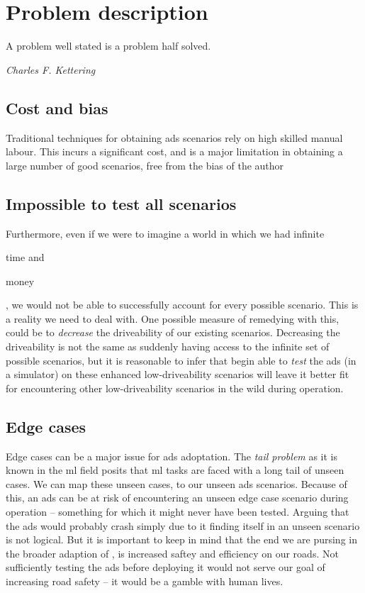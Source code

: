 \chapter{Problem description}\label{sec:problemDescription}

\epigraph{A problem well stated is a problem half solved.}{\textit{Charles F. Kettering}}

\section{Cost and bias}

Traditional techniques for obtaining \acrshort{ads} scenarios rely on high skilled manual labour.
This incurs a significant cost, and is a major limitation in obtaining a large number of good
scenarios, free from the bias of the author


\section{Impossible to test all scenarios}
Furthermore, even if we were to imagine a world in which we had infinite \begin{inparaenum}
  \item time and
  \item money
\end{inparaenum}, we would not be able to successfully account for every possible scenario. This is
a reality we need to deal with. One possible measure of remedying with this, could be to
\textit{decrease} the driveability of our existing scenarios. Decreasing the driveability is not the
same as suddenly having access to the infinite set of possible scenarios, but it is reasonable to
infer that begin able to \textit{test} the \acrshort{ads} (in a simulator) on these enhanced
low-driveability scenarios will leave it better fit for encountering other low-driveability
scenarios in the wild during operation.

\section{Edge cases}

Edge cases can be a major issue for \acrshort{ads} adoptation. The \textit{tail problem} as it is
known in the \acrshort{ml} field posits that \acrshort{ml} tasks are faced with a long tail of
unseen cases. We can map these unseen cases, to our unseen \acrshort{ads} scenarios. Because of
this, an \acrshort{ads} can be at risk of encountering an unseen edge case scenario during
operation -- something for which it might never have been tested.
Arguing that the \acrshort{ads} would probably crash simply due to it finding itself in an unseen
scenario is not logical. But it is important to keep in mind that the end we are pursing in the
broader adaption of , is increased saftey and efficiency on our roads. Not
sufficiently testing the \acrshort{ads} before deploying it would not serve our goal of increasing
road safety -- it would be a gamble with human lives.